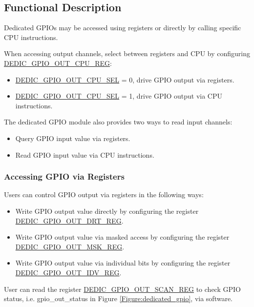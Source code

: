 \documentclass[main\_\_EN.tex]{subfiles}
\begin{document}
\subsection{Functional Description}

Dedicated GPIOs may be accessed using registers or directly by calling specific CPU instructions.

When accessing output channels, select between registers and CPU by configuring \hyperref[regdesc:DEDICGPIOOUTCPUREG]{DEDIC\_GPIO\_OUT\_CPU\_REG}:

\begin{itemize}
    \item \hyperref[fielddesc:DEDICGPIOOUTCPUSEL0]{DEDIC\_GPIO\_OUT\_CPU\_SEL} = 0, drive GPIO output via registers.
    \item \hyperref[fielddesc:DEDICGPIOOUTCPUSEL0]{DEDIC\_GPIO\_OUT\_CPU\_SEL} = 1, drive GPIO output via CPU instructions.
\end{itemize}

The dedicated GPIO module also provides two ways to read input channels:
\begin{itemize}
    \item Query GPIO input value via registers.
    \item Read GPIO input value via CPU instructions.
\end{itemize}



\subsubsection{Accessing GPIO via Registers}
Users can control GPIO output via registers in the following ways:
\begin{itemize}
    \item Write GPIO output value directly by configuring the register \hyperref[regdesc:DEDICGPIOOUTDRTREG]{DEDIC\_GPIO\_OUT\_DRT\_REG}.
    \item Write GPIO output value via masked access by configuring the register \hyperref[regdesc:DEDICGPIOOUTMSKREG]{DEDIC\_GPIO\_OUT\_MSK\_REG}.
    \item Write GPIO output value via individual bits by configuring the register \hyperref[regdesc:DEDICGPIOOUTIDVREG]{DEDIC\_GPIO\_OUT\_IDV\_REG}.
\end{itemize}

User can read the register \hyperref[regdesc:DEDICGPIOOUTSCANREG]{DEDIC\_GPIO\_OUT\_SCAN\_REG} to check GPIO status, i.e. gpio\_out\_status in Figure \ref{Figure:dedicated_gpio}, via software.
\end{document}
